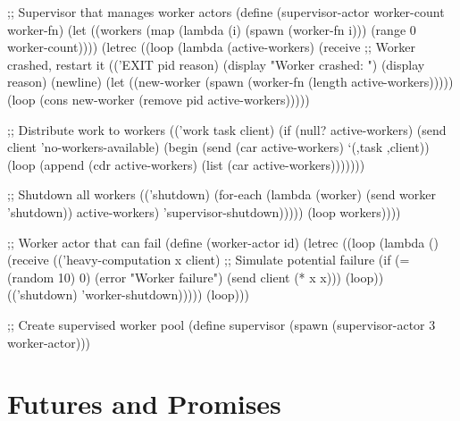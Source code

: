 \begin{example}
\begin{lambdustcode}
;; Supervisor that manages worker actors
(define (supervisor-actor worker-count worker-fn)
  (let ((workers (map (lambda (i) (spawn (worker-fn i))) 
                      (range 0 worker-count))))
    (letrec ((loop (lambda (active-workers)
                     (receive
                       ;; Worker crashed, restart it
                       (('EXIT pid reason)
                        (display "Worker crashed: ") (display reason) (newline)
                        (let ((new-worker (spawn (worker-fn (length active-workers)))))
                          (loop (cons new-worker (remove pid active-workers)))))
                       
                       ;; Distribute work to workers  
                       (('work task client)
                        (if (null? active-workers)
                            (send client 'no-workers-available)
                            (begin 
                              (send (car active-workers) `(,task ,client))
                              (loop (append (cdr active-workers) (list (car active-workers)))))))
                       
                       ;; Shutdown all workers
                       (('shutdown)
                        (for-each (lambda (worker) (send worker 'shutdown)) active-workers)
                        'supervisor-shutdown)))))
      (loop workers))))

;; Worker actor that can fail
(define (worker-actor id)
  (letrec ((loop (lambda ()
                   (receive  
                     (('heavy-computation x client)
                      ;; Simulate potential failure
                      (if (= (random 10) 0)
                          (error "Worker failure") 
                          (send client (* x x)))
                      (loop))
                     (('shutdown) 
                      'worker-shutdown)))))
    (loop)))

;; Create supervised worker pool
(define supervisor (spawn (supervisor-actor 3 worker-actor)))
\end{lambdustcode}
\end{example}

\section{Futures and Promises}
\label{sec:futures}

